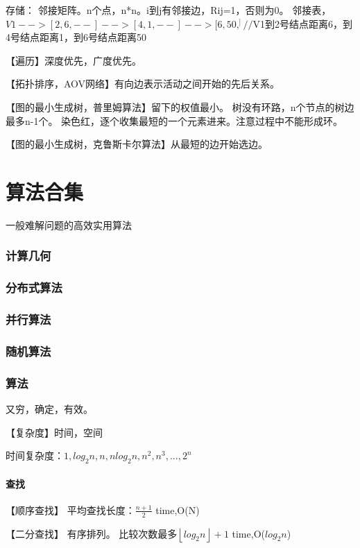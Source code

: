\documentclass[UTF8]{../computerUniverse}
\begin{document}
存储：
邻接矩阵。n个点，n*n。i到j有邻接边，Rij=1，否则为0。
邻接表，$V1-->[2,6,--]-->[4,1,--]-->[6,50,^]//$V1到2号结点距离6，到4号结点距离1，到6号结点距离50

【遍历】深度优先，广度优先。

【拓扑排序，AOV网络】有向边表示活动之间开始的先后关系。

【图的最小生成树，普里姆算法】留下的权值最小。
树没有环路，n个节点的树边最多n-1个。
染色红，逐个收集最短的一个元素进来。注意过程中不能形成环。

【图的最小生成树，克鲁斯卡尔算法】从最短的边开始选边。



\chapter{算法合集}
一般难解问题的高效实用算法


\subsection{计算几何}

\subsection{分布式算法}
\subsection{并行算法}
\subsection{随机算法}




\subsection{算法}
又穷，确定，有效。

【复杂度】时间，空间

时间复杂度：$1,log_2n,n,nlog_2n,n^2,n^3,...,2^n$

\subsubsection{查找}

【顺序查找】
平均查找长度：$\frac{n+1}{2}$
time,O(N)

【二分查找】
有序排列。
比较次数最多$\left\lfloor log_2n\right\rfloor +1$
time,O($log_2n$)
\end{document}
